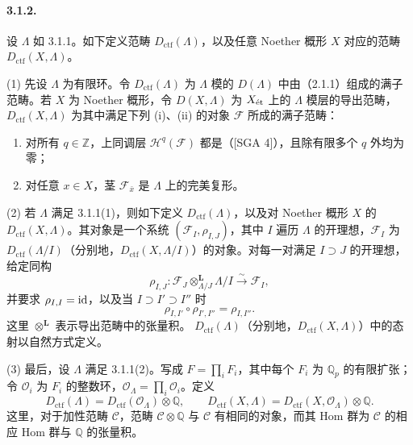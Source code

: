 \paragraph{3.1.2.} 设 $\Lambda$ 如 3.1.1。如下定义范畴 $D_{\mathrm{ctf}}(\Lambda)$，以及任意 Noether 概形 $X$ 对应的范畴 $D_{\mathrm{ctf}}(X,\Lambda)$。

(1) 先设 $\Lambda$ 为有限环。令 $D_{\mathrm{ctf}}(\Lambda)$ 为 $\Lambda$ 模的 $D(\Lambda)$ 中由（2.1.1）组成的满子范畴。若 $X$ 为 Noether 概形，令 $D(X,\Lambda)$ 为 $X_{\mathrm{\acute et}}$ 上的 $\Lambda$ 模层的导出范畴，$D_{\mathrm{ctf}}(X,\Lambda)$ 为其中满足下列 (i)、(ii) 的对象 $\mathcal F$ 所成的满子范畴：
\begin{enumerate}[label=(\roman*)]
\item 对所有 $q\in\mathbb Z$，上同调层 $\mathcal H^q(\mathcal F)$ 都是（[SGA 4]），且除有限多个 $q$ 外均为零；
\item 对任意 $x\in X$，茎 $\mathcal F_{\bar x}$ 是 $\Lambda$ 上的完美复形。
\end{enumerate}

(2) 若 $\Lambda$ 满足 3.1.1(1)，则如下定义 $D_{\mathrm{ctf}}(\Lambda)$，以及对 Noether 概形 $X$ 的 $D_{\mathrm{ctf}}(X,\Lambda)$。其对象是一个系统 $(\mathcal F_I,\rho_{I,J})$，其中 $I$ 遍历 $\Lambda$ 的开理想，$\mathcal F_I$ 为 $D_{\mathrm{ctf}}(\Lambda/I)$（分别地，$D_{\mathrm{ctf}}(X,\Lambda/I)$）的对象。对每一对满足 $I\supset J$ 的开理想，给定同构
\[
 \rho_{I,J}:\mathcal F_J\otimes^{\mathbf L}_{\Lambda/J}\Lambda/I
 \xrightarrow{\sim}\mathcal F_I,
\]
并要求 $\rho_{I,I}=\operatorname{id}$，以及当 $I\supset I'\supset I''$ 时
\[
 \rho_{I,I'}\circ\rho_{I',I''}=\rho_{I,I''}.
\]
这里 $\otimes^{\mathbf L}$ 表示导出范畴中的张量积。
$D_{\mathrm{ctf}}(\Lambda)$（分别地，$D_{\mathrm{ctf}}(X,\Lambda)$）中的态射以自然方式定义。

(3) 最后，设 $\Lambda$ 满足 3.1.1(2)。写成 $F=\prod_iF_i$，其中每个 $F_i$ 为 $\mathbb Q_p$ 的有限扩张；令 $\mathcal O_i$ 为 $F_i$ 的整数环，$\mathcal O_\Lambda=\prod_i\mathcal O_i$。定义
\[
 D_{\mathrm{ctf}}(\Lambda)=D_{\mathrm{ctf}}(\mathcal O_\Lambda)\otimes\mathbb Q,
 \qquad
 D_{\mathrm{ctf}}(X,\Lambda)=D_{\mathrm{ctf}}(X,\mathcal O_\Lambda)\otimes\mathbb Q.
\]
这里，对于加性范畴 $\mathcal C$，范畴 $\mathcal C\otimes\mathbb Q$ 与 $\mathcal C$ 有相同的对象，而其 Hom 群为 $\mathcal C$ 的相应 Hom 群与 $\mathbb Q$ 的张量积。

